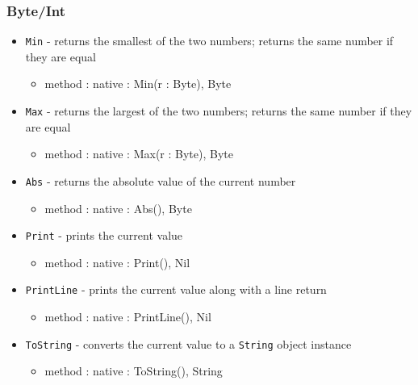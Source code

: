 \documentclass[12pt]{article}
\begin{document}
\subsubsection{Byte/Int}
\begin{itemize}
\item \texttt{Min} - returns the smallest of the two numbers; returns the same number if they are equal
  \begin{itemize}
  \item method : native : Min(r : Byte), Byte
  \end{itemize}
\item \texttt{Max} - returns the largest of the two numbers; returns the same number if they are equal
  \begin{itemize}
  \item method : native : Max(r : Byte), Byte
  \end{itemize}
\item \texttt{Abs} - returns the absolute value of the current number
  \begin{itemize}
  \item method : native : Abs(), Byte
  \end{itemize}
\item \texttt{Print} - prints the current value
  \begin{itemize}
  \item method : native : Print(), Nil
  \end{itemize}
\item \texttt{PrintLine} - prints the current value along with a line return
  \begin{itemize}
  \item method : native : PrintLine(), Nil
  \end{itemize}
\item \texttt{ToString} - converts the current value to a \texttt{String} object instance
  \begin{itemize}
  \item method : native : ToString(), String
  \end{itemize}
\end{itemize}
\end{document}
